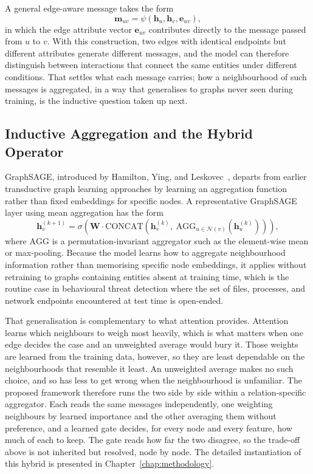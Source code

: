 \documentclass[%
    BCOR=10mm,
    DIV=13,
    toc=bibliography,
    toc=listof,
    oneside,
    12pt,
]{scrbook}
\begin{document}
A general edge-aware message takes the form
\begin{equation}
  \mathbf{m}_{uv} = \psi\!\left( \mathbf{h}_u, \mathbf{h}_v, \mathbf{e}_{uv} \right),
  \label{eq:edge_message}
\end{equation}
in which the edge attribute vector $\mathbf{e}_{uv}$ contributes directly to
the message passed from $u$ to $v$. With this construction, two edges with
identical endpoints but different attributes generate different messages, and
the model can therefore distinguish between interactions that connect the
same entities under different conditions. That settles what each message
carries; how a neighbourhood of such messages is aggregated, in a way that
generalises to graphs never seen during training, is the inductive question
taken up next.

\subsection{Inductive Aggregation and the Hybrid Operator}
\label{subsec:hybrid}

GraphSAGE, introduced by Hamilton, Ying, and
Leskovec~\cite{hamilton2017graphsage}, departs from earlier transductive
graph learning approaches by learning an aggregation function rather than
fixed embeddings for specific nodes. A representative GraphSAGE layer using
mean aggregation has the form
\begin{equation}
  \mathbf{h}_v^{(k+1)} = \sigma\!\left(
    \mathbf{W} \cdot \mathrm{CONCAT}\!\left(
      \mathbf{h}_v^{(k)},\;
      \mathrm{AGG}_{u \in \mathcal{N}(v)}\!\left( \mathbf{h}_u^{(k)} \right)
    \right)
  \right),
  \label{eq:graphsage}
\end{equation}
where $\mathrm{AGG}$ is a permutation-invariant aggregator such as the
element-wise mean or max-pooling. Because the model learns how to aggregate
neighbourhood information rather than memorising specific node embeddings, it
applies without retraining to graphs containing entities absent at training
time, which is the routine case in behavioural threat detection where the set
of files, processes, and network endpoints encountered at test time is
open-ended.

That generalisation is complementary to what attention provides. Attention
learns which neighbours to weigh most heavily, which is what matters when one
edge decides the case and an unweighted average would bury it. Those weights
are learned from the training data, however, so they are least dependable on
the neighbourhoods that resemble it least. An unweighted average makes no such
choice, and so has less to get wrong when the neighbourhood is unfamiliar. The
proposed framework therefore runs the two side by side within a
relation-specific aggregator. Each reads the same messages independently, one
weighting neighbours by learned importance and the other averaging them without
preference, and a learned gate decides, for every node and every feature, how
much of each to keep. The gate reads how far the two disagree, so the trade-off
above is not inherited but resolved, node by node. The detailed instantiation
of this hybrid is presented in Chapter~\ref{chap:methodology}.
\end{document}
